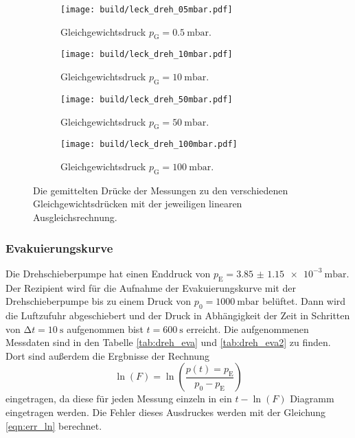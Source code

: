     \begin{figure}[h]
      \begin{subfigure}{0.48\textwidth}
        \centering
        \texttt{[image: build/leck\_dreh\_05mbar.pdf]}
        \caption{Gleichgewichtsdruck $p_\text{G} = \SI{0.5}{\milli\bar}$.}
        \label{fig:dreh_leck_05}
      \end{subfigure}
      \hfill
      \begin{subfigure}{0.48\textwidth}
        \centering
        \texttt{[image: build/leck\_dreh\_10mbar.pdf]}
        \caption{Gleichgewichtsdruck $p_\text{G} = \SI{10}{\milli\bar}$.}
        \label{fig:dreh_leck_10}
      \end{subfigure}
      \hfill
      \begin{subfigure}{0.48\textwidth}
        \centering
        \texttt{[image: build/leck\_dreh\_50mbar.pdf]}
        \caption{Gleichgewichtsdruck $p_\text{G} = \SI{50}{\milli\bar}$.}
        \label{fig:dreh_leck_50}
      \end{subfigure}
      \hfill
      \begin{subfigure}{0.48\textwidth}
        \centering
        \texttt{[image: build/leck\_dreh\_100mbar.pdf]}
        \caption{}Gleichgewichtsdruck $p_\text{G} = \SI{100}{\milli\bar}$.
        \label{fig:dreh_leck_100}
      \end{subfigure}
      \caption{Die gemittelten Drücke der Messungen zu den verschiedenen Gleichgewichtsdrücken mit der jeweiligen linearen Ausgleichsrechnung.}
      \label{fig:dreh_leck}
    \end{figure}

  \subsubsection{Evakuierungskurve}

    \noindent Die Drehschieberpumpe hat einen Enddruck von $p_\text{E} = \SI{3.85(115)e-3}{\milli\bar}$. Der Rezipient wird für die Aufnahme der Evakuierungskurve mit der Drehschieberpumpe 
    bis zu einem Druck von $p_0 = \SI{1000}{\milli\bar}$ belüftet. Dann wird die Luftzufuhr abgeschiebert und der Druck in Abhängigkeit der Zeit in 
    Schritten von $\increment t = \SI{10}{\second}$ aufgenommen bist $t = \SI{600}{\second}$ erreicht. Die aufgenommenen Messdaten sind in den Tabelle \ref{tab:dreh_eva} und \ref{tab:dreh_eva2} zu finden. 
    Dort sind außerdem die Ergbnisse der Rechnung 
    \begin{equation*}
      \ln(F) = \ln \left( \frac{p(t) = p_\text{E}}{p_0 - p_\text{E}}\right)
    \end{equation*}
    eingetragen, da diese für jeden Messung einzeln in ein $t - \ln(F)$ Diagramm eingetragen werden. Die Fehler dieses Ausdruckes werden mit der Gleichung \eqref{eqn:err_ln} berechnet.  

